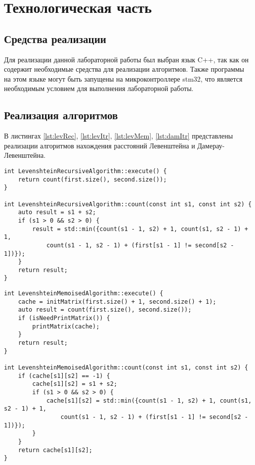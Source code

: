 \chapter{Технологическая часть}

\section{Средства реализации}

Для реализации данной лабораторной работы был выбран язык C++, так как он содержит необходимые средства для реализации алгоритмов. Также программы на этом языке могут быть запущены на микроконтроллере stm32, что является необходимым условием для выполнения лабораторной работы. 

\section{Реализация алгоритмов}

В листингах \ref{lst:levRec}, \ref{lst:levItr}, \ref{lst:levMem}, \ref{lst:damItr}  представлены реализации алгоритмов нахождения расстояний Левенштейна и Дамерау-Левенштейна.

\begin{lstlisting}[label=lst:levRec,caption=Метод рекурсивного нахождения расстояния Левенштейна]
int LevenshteinRecursiveAlgorithm::execute() {
	return count(first.size(), second.size());
}

int LevenshteinRecursiveAlgorithm::count(const int s1, const int s2) {
	auto result = s1 + s2;
	if (s1 > 0 && s2 > 0) {
		result = std::min({count(s1 - 1, s2) + 1, count(s1, s2 - 1) + 1, 
			count(s1 - 1, s2 - 1) + (first[s1 - 1] != second[s2 - 1])});
	}
	return result;
}
\end{lstlisting}

\begin{lstlisting}[label=lst:levMem,caption=Метод рекурсивного нахождения расстояния Левенштейна с мемоизацией]
int LevenshteinMemoisedAlgorithm::execute() {
	cache = initMatrix(first.size() + 1, second.size() + 1);
	auto result = count(first.size(), second.size());
	if (isNeedPrintMatrix()) {
		printMatrix(cache);
	} 
	return result;
}

int LevenshteinMemoisedAlgorithm::count(const int s1, const int s2) {
	if (cache[s1][s2] == -1) {
		cache[s1][s2] = s1 + s2;
		if (s1 > 0 && s2 > 0) {
			cache[s1][s2] = std::min({count(s1 - 1, s2) + 1, count(s1, s2 - 1) + 1, 
				count(s1 - 1, s2 - 1) + (first[s1 - 1] != second[s2 - 1])});
		}
	}
	return cache[s1][s2];
}
\end{lstlisting}

